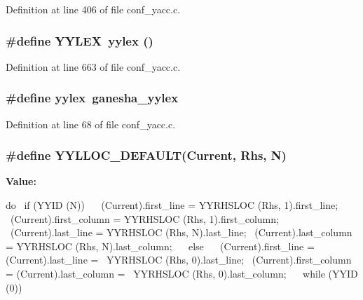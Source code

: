 Definition at line 406 of file conf\_\-yacc.c.
\subsubsection[{YYLEX}]{\setlength{\rightskip}{0pt plus 5cm}\#define YYLEX~yylex ()}\label{conf__yacc_8c_a0ea34e09602d1ede033f16ba669ef24b}


Definition at line 663 of file conf\_\-yacc.c.
\subsubsection[{yylex}]{\setlength{\rightskip}{0pt plus 5cm}\#define yylex~ganesha\_\-yylex}\label{conf__yacc_8c_a5611300548b2030d86b6ab9168132b88}


Definition at line 68 of file conf\_\-yacc.c.
\subsubsection[{YYLLOC\_\-DEFAULT}]{\setlength{\rightskip}{0pt plus 5cm}\#define YYLLOC\_\-DEFAULT(Current, \/  Rhs, \/  N)}\label{conf__yacc_8c_a485d38f93de30679900c9cad6e7f3446}
{\bfseries Value:}
\begin{DoxyCode}
do                                                                      \
      if (YYID (N))                                                    \
        {                                                               \
          (Current).first_line   = YYRHSLOC (Rhs, 1).first_line;        \
          (Current).first_column = YYRHSLOC (Rhs, 1).first_column;      \
          (Current).last_line    = YYRHSLOC (Rhs, N).last_line;         \
          (Current).last_column  = YYRHSLOC (Rhs, N).last_column;       \
        }                                                               \
      else                                                              \
        {                                                               \
          (Current).first_line   = (Current).last_line   =              \
            YYRHSLOC (Rhs, 0).last_line;                                \
          (Current).first_column = (Current).last_column =              \
            YYRHSLOC (Rhs, 0).last_column;                              \
        }                                                               \
    while (YYID (0))
\end{DoxyCode}


